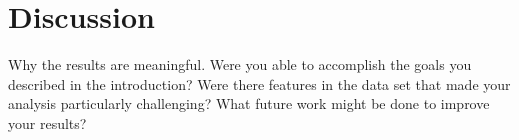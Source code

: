 \section{Discussion} \label{sec:discussion}

Why the results are meaningful. Were you able to accomplish the goals
you described in the introduction? Were there features in the data set
that made your analysis particularly challenging? What future work
might be done to improve your results?
